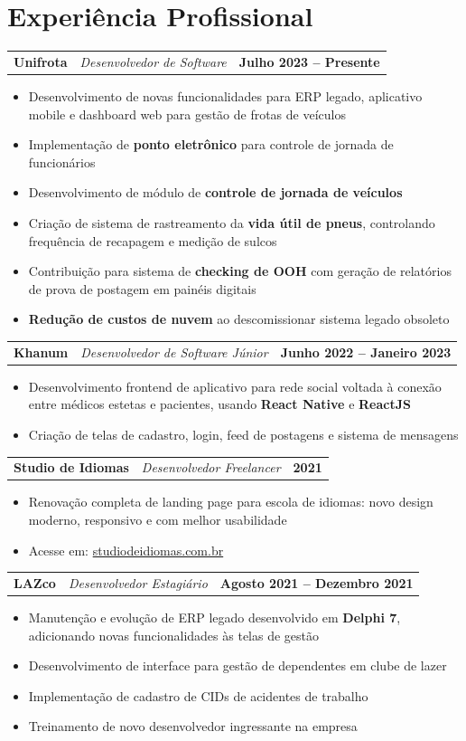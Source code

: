 \documentclass[a4paper,11pt]{article}
\makeatletter
\newenvironment{joblong}[3]
    {
    \begin{tabularx}{\linewidth}{@{}l X r@{}}
    \textbf{\color{darkblue}#1} & \hfill \textit{\small\color{medgray}#3} & \textbf{\small #2} \\[2pt]
    \end{tabularx}
    \begin{minipage}[t]{\linewidth}
    \begin{itemize}[nosep,after=\strut, leftmargin=1.2em, itemsep=3pt,label={\small\color{darkblue}$\bullet$}]
    }
    {
    \end{itemize}
    \end{minipage}
    \vspace{4pt}
    }
\makeatother
\begin{document}
\section{Experiência Profissional}

\begin{joblong}{Unifrota}{Julho 2023 -- Presente}{Desenvolvedor de Software}
\item Desenvolvimento de novas funcionalidades para ERP legado, aplicativo mobile e dashboard web para gestão de frotas de veículos
\item Implementação de \textbf{ponto eletrônico} para controle de jornada de funcionários
\item Desenvolvimento de módulo de \textbf{controle de jornada de veículos}
\item Criação de sistema de rastreamento da \textbf{vida útil de pneus}, controlando frequência de recapagem e medição de sulcos
\item Contribuição para sistema de \textbf{checking de OOH} com geração de relatórios de prova de postagem em painéis digitais
\item \textbf{Redução de custos de nuvem} ao descomissionar sistema legado obsoleto
\end{joblong}

\begin{joblong}{Khanum}{Junho 2022 -- Janeiro 2023}{Desenvolvedor de Software Júnior}
\item Desenvolvimento frontend de aplicativo para rede social voltada à conexão entre médicos estetas e pacientes, usando \textbf{React Native} e \textbf{ReactJS}
\item Criação de telas de cadastro, login, feed de postagens e sistema de mensagens
\end{joblong}

\begin{joblong}{Studio de Idiomas}{2021}{Desenvolvedor Freelancer}
\item Renovação completa de landing page para escola de idiomas: novo design moderno, responsivo e com melhor usabilidade
\item Acesse em: \href{http://studiodeidiomas.com.br/}{studiodeidiomas.com.br}
\end{joblong}

\begin{joblong}{LAZco}{Agosto 2021 -- Dezembro 2021}{Desenvolvedor Estagiário}
\item Manutenção e evolução de ERP legado desenvolvido em \textbf{Delphi 7}, adicionando novas funcionalidades às telas de gestão
\item Desenvolvimento de interface para gestão de dependentes em clube de lazer
\item Implementação de cadastro de CIDs de acidentes de trabalho
\item Treinamento de novo desenvolvedor ingressante na empresa
\end{joblong}
\end{document}
